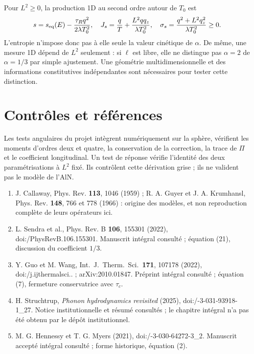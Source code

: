 \documentclass[11pt,a4paper]{article}
\begin{document}
Pour $L^2\ge0$, la production 1D au second ordre autour de $T_0$ est
\[
 s=s_{\rm eq}(E)-\frac{\tau_Rq^2}{2\lambda T_0^2},\quad
 J_s=\frac qT+\frac{L^2qq_z}{\lambda T_0^2},\quad
 \sigma_s=\frac{q^2+L^2q_z^2}{\lambda T_0^2}\ge0.
\]
L'entropie n'impose donc pas à elle seule la valeur cinétique de $\alpha$.
De même, une mesure 1D dépend de $L^2$ seulement : si $\ell$ est libre,
elle ne distingue pas $\alpha=2$ de $\alpha=1/3$ par simple ajustement.
Une géométrie multidimensionnelle et des informations constitutives indépendantes
sont nécessaires pour tester cette distinction.

\section{Contrôles et références}
Les tests angulaires du projet intègrent numériquement sur la sphère, vérifient
les moments d'ordres deux et quatre, la conservation de la correction,
la trace de $\Pi$ et le coefficient longitudinal. Un test de réponse vérifie
l'identité des deux paramétrisations à $L^2$ fixé.
Ils contrôlent cette dérivation grise ; ils ne valident pas le modèle de l'AlN.

\begin{enumerate}
\item J. Callaway, Phys. Rev. \textbf{113}, 1046 (1959) ;
R. A. Guyer et J. A. Krumhansl, Phys. Rev. \textbf{148}, 766 et 778 (1966) :
origine des modèles, et non reproduction complète de leurs opérateurs ici.
\item L. Sendra et al., Phys. Rev. B \textbf{106}, 155301 (2022),
doi:/\allowbreak PhysRevB.106.155301.
Manuscrit intégral consulté ; équation (21), discussion du coefficient $1/3$.
\item Y. Guo et M. Wang, Int.\ J.\ Therm.\ Sci.\ \textbf{171}, 107178 (2022),
doi:/\allowbreak j.\allowbreak ijthermalsci.. ;
arXiv:2010.01847.
Préprint intégral consulté ; équation (7), fermeture conservatrice avec $\tau_c$.
\item H. Struchtrup, \emph{Phonon hydrodynamics revisited} (2025),
doi:/-3-031-93918-1\_27.
Notice institutionnelle et résumé consultés ; le chapitre intégral n'a pas
été obtenu par le dépôt institutionnel.
\item M. G. Hennessy et T. G. Myers (2021),
doi:/-3-030-64272-3\_2.
Manuscrit accepté intégral consulté ; forme historique, équation (2).
\end{enumerate}
\end{document}
